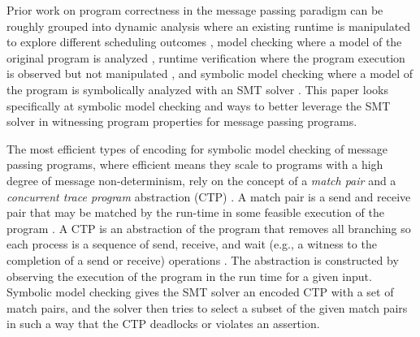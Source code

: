 Prior work on program correctness in the message passing paradigm can be roughly grouped into dynamic analysis where an existing runtime is manipulated to explore different scheduling outcomes \cite{DBLP:conf/ppopp/VakkalankaSGK08,DBLP:conf/sbmf/SharmaGB12}, model checking where a model of the original program is analyzed \cite{DBLP:conf/vmcai/Siegel07,DBLP:conf/pvm/Siegel07}, runtime verification where the program execution is observed but not manipulated \cite{DBLP:conf/sc/VetterS00,DBLP:conf/parco/KrammerBMR03,DBLP:conf/ptw/HilbrichSSM09}, and symbolic model checking where a model of the program is symbolically analyzed with an SMT solver \cite{DBLP:conf/kbse/HuangMM13,HuangNFM15}. This paper looks specifically at symbolic model checking and ways to better leverage the SMT solver in witnessing program properties for message passing programs.

The most efficient types of encoding for symbolic model checking of message passing programs, where efficient means they scale to programs with a high degree of message non-determinism, rely on the concept of a \emph{match pair} and a \emph{concurrent trace program} abstraction (CTP) \cite{DBLP:conf/kbse/HuangMM13,HuangNFM15,deadlock-draft,DBLP:conf/fm/ForejtKNS14,DBLP:conf/atva/ElwakilYW10,DBLP:conf/issta/ElwakilY10}. 
A match pair is a send and receive pair that may be matched by the run-time in some feasible execution of the program \cite{DBLP:conf/kbse/HuangMM13,HuangNFM15,deadlock-draft,DBLP:conf/fm/ForejtKNS14,DBLP:conf/atva/ElwakilYW10,DBLP:conf/issta/ElwakilY10}. 
A CTP is an abstraction of the program that removes all branching so each process is a sequence of send, receive, and wait (e.g., a witness to the completion of a send or receive) operations \cite{DBLP:conf/kbse/HuangMM13,HuangNFM15}. 
The abstraction is constructed by observing the execution of the program in the run time for a given input. Symbolic model checking gives the SMT solver an encoded CTP with a set of match pairs, and the solver then tries to select a subset of the given match pairs in such a way that the CTP deadlocks or violates an assertion. 


